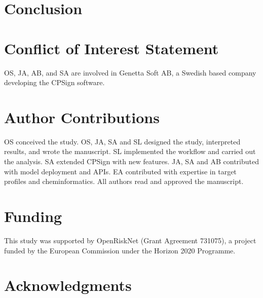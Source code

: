 \documentclass[10pt,article]{memoir}
\newcommand{\inlinetodo}[1]{{\color{magenta}\oldtodo[inline]{\color{white}\textsf{#1}}}}
\begin{document}
\FloatBarrier
\section*{Conclusion}
\section*{Conflict of Interest Statement}
OS, JA, AB, and SA are involved in Genetta Soft AB, a Swedish based company developing the CPSign software.


\section*{Author Contributions}
OS conceived the study. OS, JA, SA and SL designed the study, interpreted results, and wrote the manuscript. SL implemented the workflow and carried out the analysis. SA extended CPSign with new features. JA, SA and AB contributed with model deployment and APIs. EA contributed with expertise in target profiles and cheminformatics. All authors read and approved the manuscript.



\section*{Funding}
This study was supported by OpenRiskNet (Grant Agreement 731075), a project funded by the European Commission under the Horizon 2020 Programme.

\section*{Acknowledgments}
\inlinetodo{Add Uppmax here}
\end{document}
